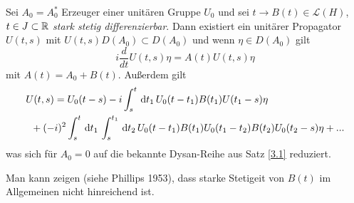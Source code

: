 \documentclass{mycourse}
\begin{document}
\begin{st}[R.S. Phillips 1953]
Sei $A_0=A_0^*$ Erzeuger einer unitären Gruppe $U_0$ und sei $t\to B(t)\in \mathcal L(H)$, $t\in J\subset \R$ \emph{stark stetig differenzierbar}. Dann existiert ein unitärer Propagator $U(t,s)$ mit
$U(t,s) D(A_0)\subset D(A_0)$ und wenn $\eta \in D(A_0)$ gilt
\[
i\frac{d}{dt} U(t,s)\eta= A(t) U(t, s) \eta
\]
mit $A(t)=A_0+B(t)$. Außerdem gilt
\begin{align*}
&U(t,s)=U_0(t-s)-i \int_s^t \dx[t_1] U_0(t-t_1) B(t_1) U(t_1-s) \eta \\ &\ \,+(-i)^2 \int_s^t \dx[t_1] \int_s^{t_1} \dx[t_2] U_0(t-t_1) B(t_1) U_0(t_1-t_2) B(t_2) U_0(t_2-s)\eta+ ...
\end{align*}
was sich für $A_0=0$ auf die bekannte Dysan-Reihe aus Satz \ref{3.1} reduziert.
\end{st}
\begin{nt*}
Man kann zeigen (siehe Phillips 1953), dass starke Stetigeit von $B(t)$ im Allgemeinen nicht hinreichend ist.
\end{nt*}
\end{document}
